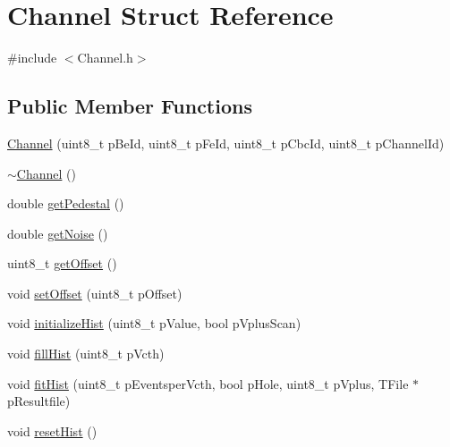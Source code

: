 \hypertarget{struct_channel}{\section{Channel Struct Reference}
\label{struct_channel}
}


{\ttfamily \#include $<$Channel.\-h$>$}

\subsection*{Public Member Functions}
\begin{DoxyCompactItemize}
\item 
\hyperlink{struct_channel_a9020dabc51a3a2bc7ba558cc3b5c8c45}{Channel} (uint8\-\_\-t p\-Be\-Id, uint8\-\_\-t p\-Fe\-Id, uint8\-\_\-t p\-Cbc\-Id, uint8\-\_\-t p\-Channel\-Id)
\item 
\hyperlink{struct_channel_a5f15ebd302464069f1a9e3f0ded14482}{$\sim$\-Channel} ()
\item 
double \hyperlink{struct_channel_ae76c0ccc6dc03c5e016cdec79a3df739}{get\-Pedestal} ()
\item 
double \hyperlink{struct_channel_a570a341791f9709d3fca63ffa9ec8e16}{get\-Noise} ()
\item 
uint8\-\_\-t \hyperlink{struct_channel_acb087e09d25e9de182a6d97d8c3dcd6e}{get\-Offset} ()
\item 
void \hyperlink{struct_channel_aa88adf1f3058e04b8763ffffe6e9b1d8}{set\-Offset} (uint8\-\_\-t p\-Offset)
\item 
void \hyperlink{struct_channel_a98159cb5895898ecce638aee007a99e9}{initialize\-Hist} (uint8\-\_\-t p\-Value, bool p\-Vplus\-Scan)
\item 
void \hyperlink{struct_channel_adb1b3676dac071110ef0df05a9ac8611}{fill\-Hist} (uint8\-\_\-t p\-Vcth)
\item 
void \hyperlink{struct_channel_a001020513f2f0f64fb8b68a31644b847}{fit\-Hist} (uint8\-\_\-t p\-Eventsper\-Vcth, bool p\-Hole, uint8\-\_\-t p\-Vplus, T\-File $\ast$p\-Resultfile)
\item 
void \hyperlink{struct_channel_ae97d073ff9a992d141eb8350f6c504ff}{reset\-Hist} ()
\end{DoxyCompactItemize}
